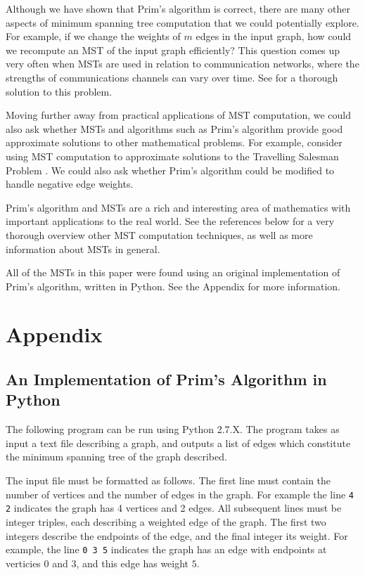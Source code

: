 \documentclass[a4paper,11pt]{report}
\theoremstyle{plain}
\theoremstyle{definition}
\begin{document}
Although we have shown that Prim's algorithm is correct, there are many other
aspects of minimum spanning tree computation that we could potentially explore.
For example, if we change the weights of $m$ edges in the input graph, how
could we recompute an MST of the input graph efficiently? This question comes
up very often when MSTs are used in relation to communication networks, where
the strengths of communications channels can vary over time. See
\cite[§8]{eisner97} for a thorough solution to this problem.

Moving further away from practical applications of MST computation, we could
also ask whether MSTs and algorithms such as Prim's algorithm provide good
approximate solutions to other mathematical problems. For example, consider
using MST computation to approximate solutions to the Travelling Salesman
Problem \cite[pp. 1096--1097]{clrs}. We could also ask whether Prim's algorithm could
be modified to handle negative edge weights.

Prim's algorithm and MSTs are a rich and interesting area of mathematics with
important applications to the real world. See the references below for a very
thorough overview other MST computation techniques, as well as more information
about MSTs in general.

All of the MSTs in this paper were found using an original implementation of
Prim's algorithm, written in Python. See the Appendix for more information.

\clearpage



\clearpage

\section*{Appendix}

\def\listingautorefname{Listing}

\subsection*{An Implementation of Prim's Algorithm in Python}

The following program can be run using Python 2.7.X. The program takes as input
a text file describing a graph, and outputs a list of edges which constitute the
minimum spanning tree of the graph described.

The input file must be formatted as follows. The first line must contain the
number of vertices and the number of edges in the graph. For example the line
\texttt{4 2} indicates the graph has 4 vertices and 2 edges. All subsequent
lines must be integer triples, each describing a weighted edge of the graph.
The first two integers describe the endpoints of the edge, and the final
integer its weight. For example, the line \texttt{0 3 5} indicates the graph
has an edge with endpoints at verticies $0$ and $3$, and this edge has weight
$5$.
\end{document}
